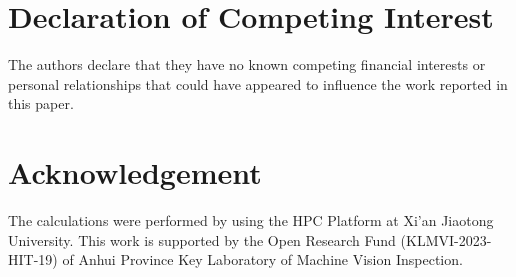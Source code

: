 \documentclass[5p, twocolumn]{elsarticle}[draft]
\begin{document}
\section*{Declaration of Competing Interest}
The authors declare that they have no known competing financial interests or personal relationships that could have appeared to influence the work reported in this paper.

\section*{Acknowledgement}
The calculations were performed by using the HPC Platform at Xi’an Jiaotong University. This work is supported by the Open Research Fund (KLMVI-2023-HIT-19) of Anhui Province Key Laboratory of Machine Vision Inspection.
\end{document}
